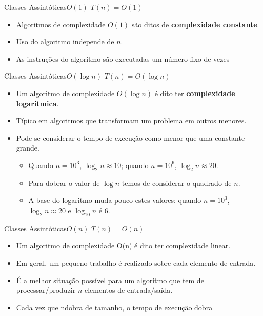 \documentclass[aspectratio=169]{beamer}
\begin{document}

\begin{frame}{Classes Assintóticas}{$O(1)$}
$T(n) = O(1)$
\begin{itemize}
 \item Algoritmos de complexidade $O(1)$ são ditos de {\bf complexidade constante}.
 \item Uso do algoritmo independe de $n$.
 \item As instruções do algoritmo são executadas um número fixo de vezes
 \end{itemize}
\end{frame}


\begin{frame}{Classes Assintóticas}{$O(\log n)$}
$T(n) = O(\log n)$
\begin{itemize}
 \item Um algoritmo de complexidade $O(\log n)$ é dito ter {\bf complexidade logarítmica}.
 \item Típico em algoritmos que transformam um problema em outros menores.
 \item Pode-se considerar o tempo de execução como menor que uma constante grande.
 \begin{itemize}
 \item Quando $n=10^3$, $\log_{2} n \approx 10$; quando $n = 10^6$, $\log_2 n \approx 20$.
 \item Para dobrar o valor de $\log n$ temos de considerar o quadrado de $n$.
 \item A base do logaritmo muda pouco estes valores: quando $n=10^3$, $\log_2 n \approx 20$ e $\log_{10} n$ é 6.
 \end{itemize}
 \end{itemize}
\end{frame}


\begin{frame}{Classes Assintóticas}{$O(n)$}
$T(n) = O(n)$
\begin{itemize}
 \item Um algoritmo de complexidade O(n) é dito ter complexidade linear.
 \item Em geral, um pequeno trabalho é realizado sobre cada elemento de entrada.
 \item É a melhor situação possível para um algoritmo que tem de processar/produzir $n$ elementos de entrada/saída.
 \item Cada vez que ndobra de tamanho, o tempo de execução dobra
 \end{itemize}
\end{frame}
\end{document}
